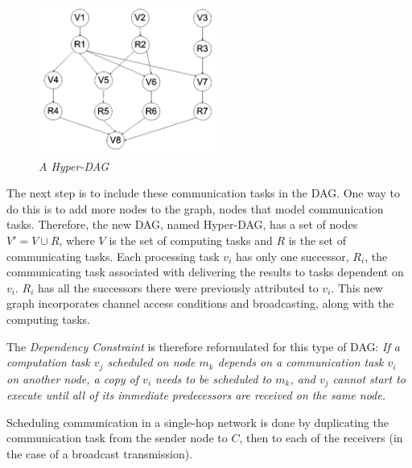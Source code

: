 \begin{figure}
  \begin{center}
    \includegraphics[width=60mm]{related/hyperdag.png}
  \end{center}
  \caption{\small \itshape{ A Hyper-DAG}}
\end{figure}
The next step is to include these communication tasks in the DAG. One way to do this is to add more nodes to the graph, nodes that
model communication tasks. Therefore, the new DAG, named Hyper-DAG, has a set of nodes $V' = V \cup R$, where $V$ is the set of computing
tasks and $R$ is the set of communicating tasks. Each processing task $v_i$ has only one successor, $R_i$, the communicating task
associated with delivering the results to tasks dependent on $v_i$. $R_i$ has all the successors there were previously attributed to
$v_i$. This new graph incorporates channel access conditions and broadcasting, along with the computing tasks.

The \textit{Dependency Constraint} is therefore reformulated for this type of DAG: \textit{If a computation task $v_j$ scheduled on node $m_k$
depends on a communication task $v_i$ on another node, a copy of $v_i$ needs to be scheduled to $m_k$, and $v_j$ cannot start to 
execute until all of its immediate predecessors are received on the same node.}

Scheduling communication in a single-hop network is done by duplicating the communication task from the sender node to $C$, then to each
of the receivers (in the case of a broadcast transmission). 

